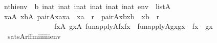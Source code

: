 \begin{isabellebody}
\ \ \ \ {\isachardoublequoteopen}nth{\isacharparenleft}{\kern0pt}i{}{\isacharcomma}{\kern0pt}env{\isacharparenright}{\kern0pt}\ {\isacharequal}{\kern0pt}\ b{\isachardoublequoteclose}\ {\isachardoublequoteopen}i{}{\isasymin}nat{\isachardoublequoteclose}\ {\isachardoublequoteopen}i{}{\isasymin}nat{\isachardoublequoteclose}\ {\isachardoublequoteopen}i{}{\isasymin}nat{\isachardoublequoteclose}\ {\isachardoublequoteopen}i{}{\isasymin}nat{\isachardoublequoteclose}\ {\isachardoublequoteopen}i{}{\isasymin}nat{\isachardoublequoteclose}\ {\isachardoublequoteopen}i{}{\isasymin}nat{\isachardoublequoteclose}\ {\isachardoublequoteopen}env\ {\isasymin}\ list{\isacharparenleft}{\kern0pt}A{\isacharparenright}{\kern0pt}{\isachardoublequoteclose}\isanewline
\ \ \isanewline
\ \ \ \ {\isachardoublequoteopen}{\isacharparenleft}{\kern0pt}{\isasymexists}xa{\isasymin}A{\isachardot}{\kern0pt}\ {\isasymexists}xb{\isasymin}A{\isachardot}{\kern0pt}\ pair{\isacharparenleft}{\kern0pt}{\isacharhash}{\kern0pt}{\isacharhash}{\kern0pt}A{\isacharcomma}{\kern0pt}x{\isacharcomma}{\kern0pt}a{\isacharcomma}{\kern0pt}xa{\isacharparenright}{\kern0pt}\ {\isacharampersand}{\kern0pt}\ xa\ {\isasymin}\ r\ {\isacharampersand}{\kern0pt}\ pair{\isacharparenleft}{\kern0pt}{\isacharhash}{\kern0pt}{\isacharhash}{\kern0pt}A{\isacharcomma}{\kern0pt}x{\isacharcomma}{\kern0pt}b{\isacharcomma}{\kern0pt}xb{\isacharparenright}{\kern0pt}\ {\isacharampersand}{\kern0pt}\ xb\ {\isasymin}\ r\ {\isacharampersand}{\kern0pt}\isanewline
\ \ \ \ \ \ \ \ \ \ \ \ \ \ \ \ \ \ {\isacharparenleft}{\kern0pt}{\isasymexists}fx{\isasymin}A{\isachardot}{\kern0pt}\ {\isasymexists}gx{\isasymin}A{\isachardot}{\kern0pt}\ fun{\isacharunderscore}{\kern0pt}apply{\isacharparenleft}{\kern0pt}{\isacharhash}{\kern0pt}{\isacharhash}{\kern0pt}A{\isacharcomma}{\kern0pt}f{\isacharcomma}{\kern0pt}x{\isacharcomma}{\kern0pt}fx{\isacharparenright}{\kern0pt}\ {\isacharampersand}{\kern0pt}\ fun{\isacharunderscore}{\kern0pt}apply{\isacharparenleft}{\kern0pt}{\isacharhash}{\kern0pt}{\isacharhash}{\kern0pt}A{\isacharcomma}{\kern0pt}g{\isacharcomma}{\kern0pt}x{\isacharcomma}{\kern0pt}gx{\isacharparenright}{\kern0pt}\ {\isacharampersand}{\kern0pt}\ fx\ {\isasymnoteq}\ gx{\isacharparenright}{\kern0pt}{\isacharparenright}{\kern0pt}\isanewline
\ \ \ \ {\isasymlongleftrightarrow}\ sats{\isacharparenleft}{\kern0pt}A{\isacharcomma}{\kern0pt}{\isacharquery}{\kern0pt}rffm{\isacharparenleft}{\kern0pt}i{}{\isacharcomma}{\kern0pt}i{}{\isacharcomma}{\kern0pt}i{}{\isacharcomma}{\kern0pt}i{}{\isacharcomma}{\kern0pt}i{}{\isacharcomma}{\kern0pt}i{}{\isacharparenright}{\kern0pt}{\isacharcomma}{\kern0pt}env{\isacharparenright}{\kern0pt}{\isachardoublequoteclose}\isanewline

\end{isabellebody}
